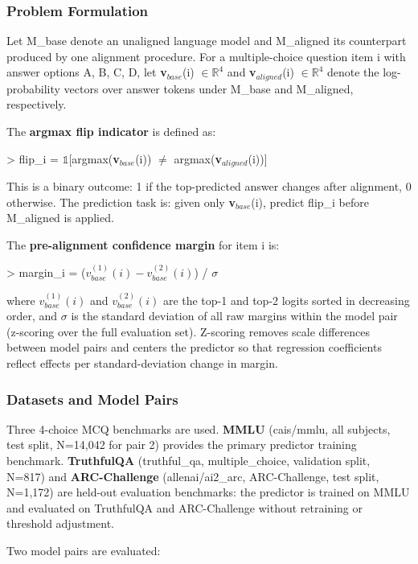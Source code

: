 
\subsubsection{Problem Formulation}

Let M\_base denote an unaligned language model and M\_aligned its counterpart produced by one alignment procedure. For a multiple-choice question item i with answer options {A, B, C, D}, let \textbf{v}$_{base}$(i) $\in \mathbb{R}^4$ and \textbf{v}$_{aligned}$(i) $\in \mathbb{R}^4$ denote the log-probability vectors over answer tokens under M\_base and M\_aligned, respectively.

The \textbf{argmax flip indicator} is defined as:

> flip\_i = $\mathbb{1}$[argmax(\textbf{v}$_{base}$(i)) $\neq$ argmax(\textbf{v}$_{aligned}$(i))]

This is a binary outcome: 1 if the top-predicted answer changes after alignment, 0 otherwise. The prediction task is: given only \textbf{v}$_{base}$(i), predict flip\_i before M\_aligned is applied.

The \textbf{pre-alignment confidence margin} for item i is:

> margin\_i = ($v_{base}^{(1)}(i) - v_{base}^{(2)}(i)$) / $\sigma$

where $v_{base}^{(1)}(i)$ and $v_{base}^{(2)}(i)$ are the top-1 and top-2 logits sorted in decreasing order, and $\sigma$ is the standard deviation of all raw margins within the model pair (z-scoring over the full evaluation set). Z-scoring removes scale differences between model pairs and centers the predictor so that regression coefficients reflect effects per standard-deviation change in margin.

\subsubsection{Datasets and Model Pairs}

Three 4-choice MCQ benchmarks are used. \textbf{MMLU} (cais/mmlu, all subjects, test split, N=14,042 for pair 2) provides the primary predictor training benchmark. \textbf{TruthfulQA} (truthful\_qa, multiple\_choice, validation split, N=817) and \textbf{ARC-Challenge} (allenai/ai2\_arc, ARC-Challenge, test split, N=1,172) are held-out evaluation benchmarks: the predictor is trained on MMLU and evaluated on TruthfulQA and ARC-Challenge without retraining or threshold adjustment.

Two model pairs are evaluated:

